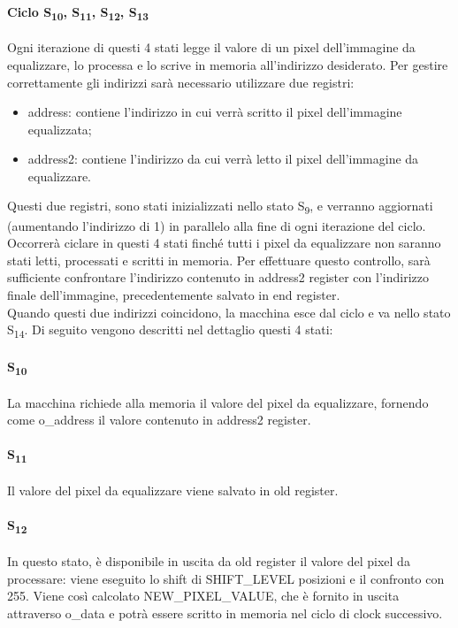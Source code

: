 \paragraph{Ciclo S\textsubscript{10}, S\textsubscript{11}, S\textsubscript{12}, S\textsubscript{13}}
Ogni iterazione di questi 4 stati legge il valore di un pixel dell'immagine da equalizzare, lo processa e lo scrive in memoria all'indirizzo desiderato.
Per gestire correttamente gli indirizzi sarà necessario utilizzare due registri:
\begin{itemize}
    \item address: contiene l'indirizzo in cui verrà scritto il pixel dell'immagine equalizzata; %
    \item address2: contiene l'indirizzo da cui verrà letto il pixel dell'immagine da equalizzare. %
\end{itemize}
Questi due registri, sono stati inizializzati nello stato S\textsubscript{9}, e verranno aggiornati (aumentando l'indirizzo di 1) in parallelo alla fine di ogni iterazione del ciclo.
Occorrerà ciclare in questi 4 stati finché tutti i pixel da equalizzare non saranno stati letti, processati e scritti in memoria. Per effettuare questo controllo, sarà sufficiente confrontare l'indirizzo contenuto in address2 register con l'indirizzo finale dell'immagine, precedentemente salvato in end register.\\
Quando questi due indirizzi coincidono, la macchina esce dal ciclo e va nello stato S\textsubscript{14}. Di seguito vengono descritti nel dettaglio questi 4 stati:
\paragraph{S\textsubscript{10}}
La macchina richiede alla memoria il valore del pixel da equalizzare, fornendo come o\_address il valore contenuto in address2 register.
\paragraph{S\textsubscript{11}}
Il valore del pixel da equalizzare viene salvato in old register.
\paragraph{S\textsubscript{12}}
In questo stato, è disponibile in uscita da old register il valore del pixel da processare: viene eseguito lo shift di SHIFT\_LEVEL posizioni e il confronto con 255. Viene così calcolato NEW\_PIXEL\_VALUE, che è fornito in uscita attraverso o\_data e potrà essere scritto in memoria nel ciclo di clock successivo.
